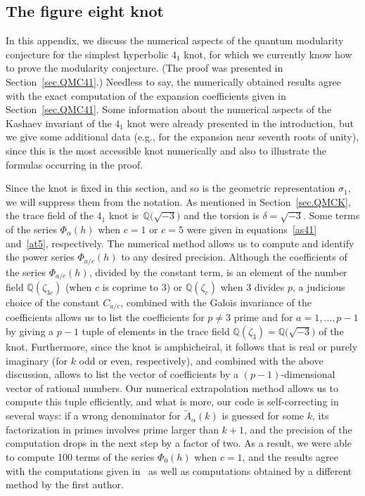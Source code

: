 \documentclass[pdftex]{sigma}
\numberwithin{equation}{section}
\def\BQ{\mathbb Q}
\def\wt{\widetilde}
\def\z{\zeta}
\def\a{\alpha}
\def\a{\alpha}
\def\z{\zeta}
\def\s{\sigma}
\def\tiA{\wt A}
\begin{document}
\subsection{The figure eight knot}
\label{sub.41}

In this appendix, we discuss the numerical aspects of the quantum modularity
conjecture for the simplest hyperbolic $4_1$ knot, for which we currently
know how to prove the modularity conjecture.
(The proof was presented in Section~\ref{sec.QMC41}.)
Needless to say, the numerically obtained results agree with the exact
computation of the expansion coefficients given in Section~\ref{sec.QMC41}.
Some information about the numerical aspects of the Kashaev invariant
of the $4_1$ knot were already presented in the introduction, but we give some
additional data (e.g., for the expansion near seventh roots of unity),
since this is the most accessible knot numerically and also to illustrate
the formulas occurring in the proof.

Since the knot is fixed in this section, and so is the
geometric representation $\s_1$, we will suppress them
from the notation. As mentioned in Section~\ref{sec.QMCK}, the
trace field of the $4_1$ knot is~$\BQ\big(\sqrt{-3}\big)$ and the torsion
is $\delta = \sqrt{-3}$. Some terms of the series $\Phi_\a(h)$
when $c=1$ or $c=5$ were given in
equations~\eqref{as41} and~\eqref{at5}, respectively.
The numerical method allows us to compute and identify
the power series $\Phi_{a/c}(h)$ to any desired precision. Although
the coefficients of the series $\Phi_{a/c}(h)$, divided by the
constant term, is an element of the number field $\BQ(\z_{3c})$ (when
$c$ is coprime to $3$) or $\BQ(\z_c)$ when $3$ divides $p$, a judicious
choice of the constant $C_{a/c}$, combined with the Galois invariance
of the coefficients allows us to list the coefficients \smash{$\tiA_{a/p}(k)$} for
$p \neq 3$ prime and for $a=1,\dots,p-1$ by giving a $p-1$ tuple of elements
in the trace field $\BQ(\z_3)=\BQ\big(\sqrt{-3}\big)$ of the knot. Furthermore,
since the knot is amphicheiral, it follows that \smash{$\tiA_{a/p}(k)$} is real or purely
imaginary (for $k$ odd or even, respectively), and combined with the above
discussion, allows to list the vector of coefficients
\smash{$\big(\tiA_{1/p}(k),\dots,\tiA_{(p-1)/p}(k)\big)$} by a $(p-1)$-dimensional vector of rational
numbers. Our numerical extrapolation method allows us to compute this
tuple efficiently, and what is more, our code is self-correcting in
several ways: if a wrong denominator for $\tiA_{\a}(k)$ is guessed
for some $k$, its factorization in primes involves prime larger than $k+1$,
and the precision of the computation drops in the next step by
a factor of two. As a result, we were able to compute 100 terms of the
series $\Phi_0(h)$ when $c=1$, and the results agree with the
computations given in~\cite{DGLZ} as well as computations obtained by
a different method by the first author.
\end{document}
